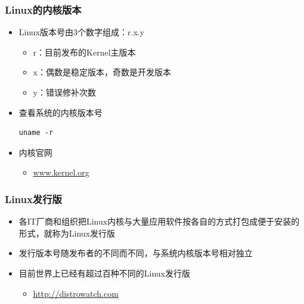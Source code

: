 \documentclass[xcolor=svgnames,bigger,presentation]{beamer}
\begin{document}
\begin{frame}[fragile]
\frametitle{Linux的内核版本}
\label{sec-2-3-5}
\begin{itemize}

\item Linux版本号由3个数字组成：r.x.y
\label{sec-2-3-5-1}%
\begin{itemize}

\item r：目前发布的Kernel主版本
\label{sec-2-3-5-1-1}%

\item x：偶数是稳定版本，奇数是开发版本
\label{sec-2-3-5-1-2}%

\item y：错误修补次数
\label{sec-2-3-5-1-3}%
\end{itemize} %

\item 查看系统的内核版本号\\
\label{sec-2-3-5-2}%
\begin{verbatim}
uname -r
\end{verbatim}

\item 内核官网
\label{sec-2-3-5-3}%
\begin{itemize}

\item \href{https://www.kernel.org}{www.kernel.org}
\label{sec-2-3-5-3-1}%
\end{itemize} %
\end{itemize} %
\end{frame}
\begin{frame}
\frametitle{Linux发行版}
\label{sec-2-3-6}
\begin{itemize}

\item 各IT厂商和组织把Linux内核与大量应用软件按各自的方式打包成便于安装的形式，就称为Linux发行版
\label{sec-2-3-6-1}%

\item 发行版本号随发布者的不同而不同，与系统内核版本号相对独立
\label{sec-2-3-6-2}%

\item 目前世界上已经有超过百种不同的Linux发行版
\label{sec-2-3-6-3}%
\begin{itemize}

\item \href{http://distrowatch.com}{http://distrowatch.com}
\label{sec-2-3-6-3-1}%
\end{itemize} %
\end{itemize} %
\end{frame}
\end{document}
